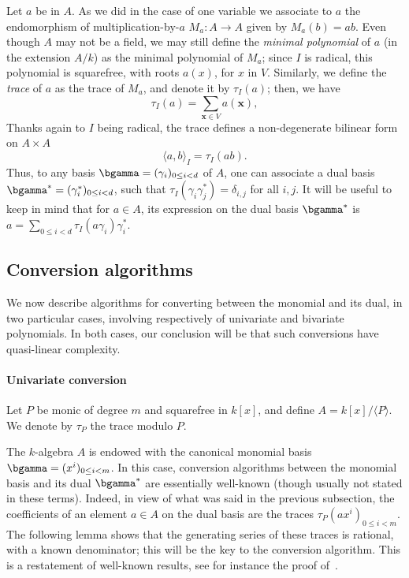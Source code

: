 \documentclass{sig-alternate}
\def\x {\ensuremath{\mathbf{x}}}
\newcommand{\ang}[1]{\langle#1\rangle}
\begin{document}
Let $a$ be in $A$. As we did in the case of one variable we associate
to $a$ the endomorphism of multiplication-by-$a$ $M_a: A \to A$ given
by $M_a(b)=ab$.  Even though $A$ may not be a field, we may still
define the {\em minimal polynomial} of $a$ (in the extension $A/k$) as
the minimal polynomial of $M_a$; since $I$ is radical, this polynomial
is squarefree, with roots $a(x)$, for $x$ in $V$. Similarly, we define
the \emph{trace} of $a$ as the trace of $M_a$, and denote it by
$\tau_I(a)$; then, we have
\begin{equation}\label{eq:tr}
\tau_{I}(a)=\sum_{\x \in V} a(\x),
\end{equation}
Thanks again to $I$ being radical, the trace defines a non-degenerate
bilinear form on $A\times A$
\begin{equation}
  \label{eq:trace-def}
  \ang{a,b}_I = \tau_I(ab).
\end{equation}
Thus, to any basis $\bgamma=(\gamma_i)_{0 \le i < d}$ of $A$, one can
associate a dual basis $\bgamma^\ast=(\gamma^\ast_i)_{0 \le i < d}$,
such that $\tau_I(\gamma_i \gamma^\ast_j)=\delta_{i,j}$ for all $i,j$.
It will be useful to keep in mind that for $a \in A$, its expression
on the dual basis $\bgamma^\ast$ is $a=\sum_{0 \le i < d} \tau_I(a
\gamma_i) \gamma^\ast_i$.



\subsection{Conversion algorithms} \label{ssec:conversions}
\label{sec:trace-formulas}

We now describe algorithms for converting between the monomial and its
dual, in two particular cases, involving respectively of univariate
and bivariate polynomials. In both cases, our conclusion will be that
such conversions have quasi-linear complexity.

\paragraph*{{\bf \rm Univariate conversion}} Let $P$ be monic of degree $m$ 
and squarefree in $k[x]$, and define $A=k[x]/\ang{P}$. We denote by
$\tau_P$ the trace modulo $P$.

The $k$-algebra $A$ is endowed with the canonical monomial basis
$\bgamma=(x^i)_{0 \le i < m}$.  In this case, conversion algorithms
between the monomial basis and its dual $\bgamma^\ast$ are essentially
well-known (though usually not stated in these terms). Indeed, in view
of what was said in the previous subsection, the coefficients of an
element $a \in A$ on the dual basis are the traces $\tau_P(ax^i)_{0
  \le i < m}$.  The following lemma shows that the generating series
of these traces is rational, with a known denominator; this will be
the key to the conversion algorithm. This is a restatement of
well-known results, see for instance the proof
of~\cite[Theorem~3.1]{rouiller99}.
\end{document}
